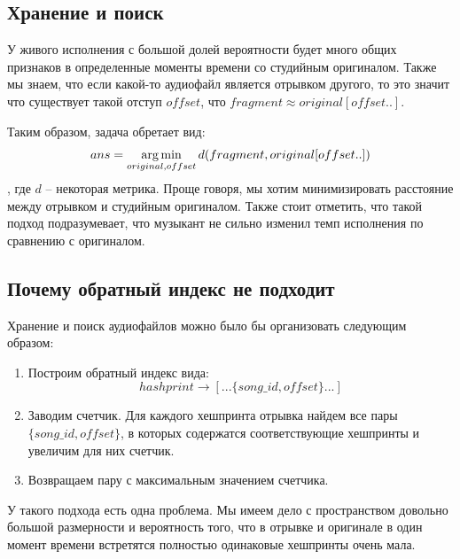 \subsection{Хранение и поиск}
У живого исполнения с большой долей вероятности будет много общих признаков
в определенные моменты времени со студийным оригиналом. Также мы знаем, что
если какой-то аудиофайл является отрывком другого, то это значит что существует
такой отступ $offset$, что $fragment \approx original[offset..]$.

Таким образом, задача обретает вид:
\begin{equation}
ans = \operatorname*{arg\,min}_{original, offset}d(fragment, original[offset..])
\end{equation}
, где $d$ -- некоторая метрика. Проще говоря, мы хотим минимизировать расстояние между
отрывком и студийным оригиналом. Также стоит отметить, что такой подход подразумевает,
что музыкант не сильно изменил темп исполнения по сравнению с оригиналом.

\subsection{Почему обратный индекс не подходит}
Хранение и поиск аудиофайлов можно было бы организовать следующим образом:
\begin{enumerate}[label=\arabic*.]
    \item Построим обратный индекс вида:
    $$hashprint \to [...\{song\_id, offset\}...]$$
    \item Заводим счетчик. Для каждого хешпринта отрывка
    найдем все пары $\{song\_id, offset\}$, в которых содержатся
    соответствующие хешпринты и увеличим для них счетчик.
    \item Возвращаем пару с максимальным значением счетчика.
\end{enumerate}
У такого подхода есть одна проблема. Мы имеем дело с пространством довольно
большой размерности и вероятность того, что в отрывке и оригинале в один момент времени
встретятся полностью одинаковые хешпринты очень мала.

